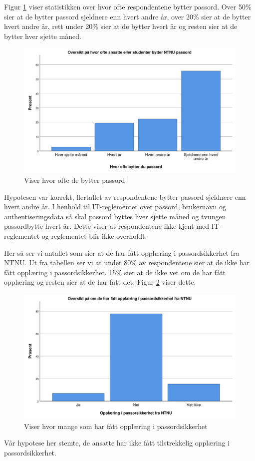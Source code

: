 Figur \ref{fig:bytter-passord} viser statistikken over hvor ofte respondentene bytter passord. Over 50\% sier at de bytter passord sjeldnere enn hvert andre år, over 20\% sier at de bytter hvert andre år, rett under 20\% sier at de bytter hvert år og resten sier at de bytter hver sjette måned. 
\begin{figure}[H]
    \centering
    \includegraphics[scale=0.5]{case_2/bilder/spss/bytter_passord.pdf}
    \caption[bytter-passord]{Viser hvor ofte de bytter passord}
    \label{fig:bytter-passord}
\end{figure}
Hypotesen var korrekt, flertallet av respondentene bytter passord sjeldnere enn hvert andre år. I henhold til IT-reglementet over passord, brukernavn og authentiseringsdata så skal passord byttes hver sjette måned og tvungen passordbytte hvert år. Dette viser at respondentene ikke kjent med IT-reglementet og reglementet blir ikke overholdt.

Her så ser vi antallet som sier at de har fått opplæring i passordsikkerhet fra NTNU. Ut fra tabellen ser vi at under 80\% av respondentene sier at de ikke har fått opplæring i passordsikkerhet. 15\% sier at de ikke vet om de har fått opplæring og resten sier at de har fått det. Figur \ref{fig:passordsikkerhet} viser dette. 
\begin{figure}[H]
    \centering
    \includegraphics[scale=0.5]{case_2/bilder/spss/opplaring_passordsikk_NTNU.pdf}
    \caption[passordsikkerhet]{Viser hvor mange som har fått opplæring i passordsikkerhet}
    \label{fig:passordsikkerhet}
\end{figure}
Vår hypotese her stemte, de ansatte har ikke fått tilstrekkelig opplæring i passordsikkerhet.  


